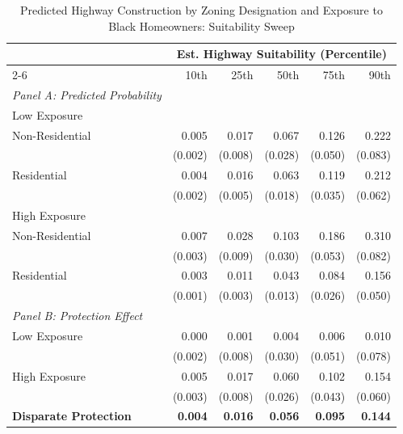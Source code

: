 \begin{table}[h]
\centering
\caption{Predicted Highway Construction by Zoning Designation and Exposure to Black Homeowners: Suitability Sweep}
\label{tab:predicted_outcomes/black_homeowners_sweep}
\begin{threeparttable}
\begin{tabular}{lr@{\hspace{1.2em}}r@{\hspace{1.2em}}r@{\hspace{1.2em}}r@{\hspace{1.2em}}r@{\hspace{1.2em}}}
\toprule
 & \multicolumn{5}{c}{Est. Highway Suitability (Percentile)} \\
\cmidrule(l){2-6}
 & 10th & 25th & 50th & 75th & 90th \\
\midrule
\textit{Panel A: Predicted Probability} & & & & & \\
\addlinespace[2pt]
Low Exposure & & & & & \\
\quad Non-Residential & 0.005 & 0.017 & 0.067 & 0.126 & 0.222 \\
 & (0.002) & (0.008) & (0.028) & (0.050) & (0.083) \\[4pt]
\quad Residential & 0.004 & 0.016 & 0.063 & 0.119 & 0.212 \\
 & (0.002) & (0.005) & (0.018) & (0.035) & (0.062) \\[4pt]
High Exposure & & & & & \\
\quad Non-Residential & 0.007 & 0.028 & 0.103 & 0.186 & 0.310 \\
 & (0.003) & (0.009) & (0.030) & (0.053) & (0.082) \\[4pt]
\quad Residential & 0.003 & 0.011 & 0.043 & 0.084 & 0.156 \\
 & (0.001) & (0.003) & (0.013) & (0.026) & (0.050) \\[4pt]
\midrule
\textit{Panel B: Protection Effect} & & & & & \\
\addlinespace[2pt]
Low Exposure & 0.000 & 0.001 & 0.004 & 0.006 & 0.010 \\
 & (0.002) & (0.008) & (0.030) & (0.051) & (0.078) \\[4pt]
High Exposure & 0.005\rlap{$^{*}$} & 0.017\rlap{$^{**}$} & 0.060\rlap{$^{**}$} & 0.102\rlap{$^{**}$} & 0.154\rlap{$^{**}$} \\
 & (0.003) & (0.008) & (0.026) & (0.043) & (0.060) \\[4pt]
\addlinespace[2pt]
\textbf{Disparate Protection} & \textbf{0.004}\rlap{$^{**}$} & \textbf{0.016}\rlap{$^{***}$} & \textbf{0.056}\rlap{$^{***}$} & \textbf{0.095}\rlap{$^{***}$} & \textbf{0.144}\rlap{$^{**}$} \\

\end{tabular}
\end{threeparttable}
\end{table}
